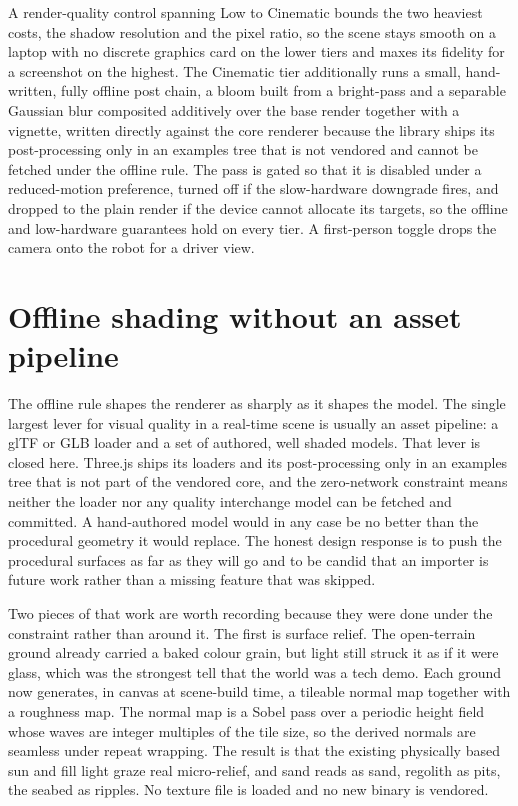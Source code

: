 \documentclass[11pt,a4paper]{report}
\begin{document}
A render-quality control spanning Low to Cinematic bounds the two heaviest costs, the shadow resolution and the pixel ratio, so the scene stays smooth on a laptop with no discrete graphics card on the lower tiers and maxes its fidelity for a screenshot on the highest. The Cinematic tier additionally runs a small, hand-written, fully offline post chain, a bloom built from a bright-pass and a separable Gaussian blur composited additively over the base render together with a vignette, written directly against the core renderer because the library ships its post-processing only in an examples tree that is not vendored and cannot be fetched under the offline rule. The pass is gated so that it is disabled under a reduced-motion preference, turned off if the slow-hardware downgrade fires, and dropped to the plain render if the device cannot allocate its targets, so the offline and low-hardware guarantees hold on every tier. A first-person toggle drops the camera onto the robot for a driver view.

\section{Offline shading without an asset pipeline}
The offline rule shapes the renderer as sharply as it shapes the model. The single largest lever for visual quality in a real-time scene is usually an asset pipeline: a glTF or GLB loader and a set of authored, well shaded models. That lever is closed here. Three.js ships its loaders and its post-processing only in an examples tree that is not part of the vendored core, and the zero-network constraint means neither the loader nor any quality interchange model can be fetched and committed. A hand-authored model would in any case be no better than the procedural geometry it would replace. The honest design response is to push the procedural surfaces as far as they will go and to be candid that an importer is future work rather than a missing feature that was skipped.

Two pieces of that work are worth recording because they were done under the constraint rather than around it. The first is surface relief. The open-terrain ground already carried a baked colour grain, but light still struck it as if it were glass, which was the strongest tell that the world was a tech demo. Each ground now generates, in canvas at scene-build time, a tileable normal map together with a roughness map. The normal map is a Sobel pass over a periodic height field whose waves are integer multiples of the tile size, so the derived normals are seamless under repeat wrapping. The result is that the existing physically based sun and fill light graze real micro-relief, and sand reads as sand, regolith as pits, the seabed as ripples. No texture file is loaded and no new binary is vendored.
\end{document}
